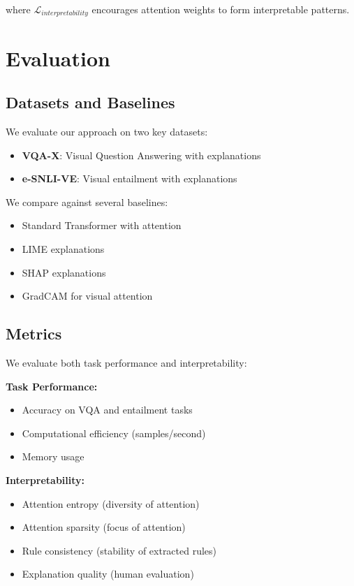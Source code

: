 \documentclass[manuscript,review,anonymous]{acmart}
\begin{document}
where $\mathcal{L}_{interpretability}$ encourages attention weights to form interpretable patterns.

\section{Evaluation}

\subsection{Datasets and Baselines}

We evaluate our approach on two key datasets:

\begin{itemize}
    \item \textbf{VQA-X}: Visual Question Answering with explanations
    \item \textbf{e-SNLI-VE}: Visual entailment with explanations
\end{itemize}

We compare against several baselines:
\begin{itemize}
    \item Standard Transformer with attention
    \item LIME explanations
    \item SHAP explanations
    \item GradCAM for visual attention
\end{itemize}

\subsection{Metrics}

We evaluate both task performance and interpretability:

\textbf{Task Performance:}
\begin{itemize}
    \item Accuracy on VQA and entailment tasks
    \item Computational efficiency (samples/second)
    \item Memory usage
\end{itemize}

\textbf{Interpretability:}
\begin{itemize}
    \item Attention entropy (diversity of attention)
    \item Attention sparsity (focus of attention)
    \item Rule consistency (stability of extracted rules)
    \item Explanation quality (human evaluation)
\end{itemize}
\end{document}
